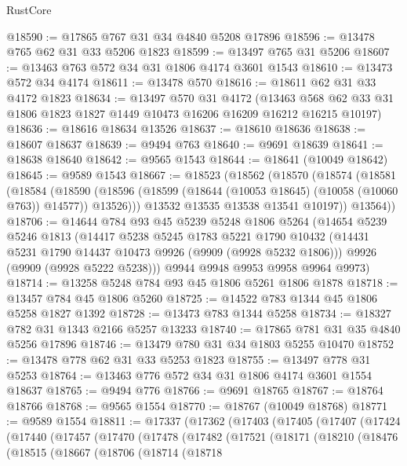 \begin{lexlean}{RustCore}
\begin{coremodule}
@18590 := @17865 @767 @31 @34 @4840 @5208 @17896
@18596 := @13478 @765 @62 @31 @33 @5206 @1823
@18599 := @13497 @765 @31 @5206
@18607 := @13463 @763 @572 @34 @31 @1806 @4174 @3601 @1543
@18610 := @13473 @572 @34 @4174
@18611 := @13478 @570
@18616 := @18611 @62 @31 @33 @4172 @1823
@18634 := @13497
    @570
    @31
    @4172
    (@13463 @568 @62 @33 @31 @1806 @1823 @1827 @1449 @10473 @16206 @16209 @16212 @16215 @10197)
@18636 := @18616 @18634 @13526
@18637 := @18610 @18636
@18638 := @18607 @18637
@18639 := @9494 @763
@18640 := @9691 @18639
@18641 := @18638 @18640
@18642 := @9565 @1543
@18644 := @18641 (@10049 @18642)
@18645 := @9589 @1543
@18667 := @18523
    (@18562
      (@18570
        (@18574
          (@18581
            (@18584
              (@18590
                (@18596 (@18599 (@18644 (@10053 @18645) (@10058 (@10060 @763)) @14577)) @13526)))
            @13532
            @13535
            @13538
            @13541
            @10197))
        @13564))
@18706 := @14644
    @784
    @93
    @45
    @5239
    @5248
    @1806
    @5264
    (@14654
      @5239
      @5246
      @1813
      (@14417
        @5238
        @5245
        @1783
        @5221
        @1790
        @10432
        (@14431 @5231 @1790 @14437 @10473 @9926 (@9909 (@9928 @5232 @1806)))
        @9926
        (@9909 (@9928 @5222 @5238)))
      @9944
      @9948
      @9953
      @9958
      @9964
      @9973)
@18714 := @13258 @5248 @784 @93 @45 @1806 @5261 @1806 @1878
@18718 := @13457 @784 @45 @1806 @5260
@18725 := @14522 @783 @1344 @45 @1806 @5258 @1827 @1392
@18728 := @13473 @783 @1344 @5258
@18734 := @18327 @782 @31 @1343 @2166 @5257 @13233
@18740 := @17865 @781 @31 @35 @4840 @5256 @17896
@18746 := @13479 @780 @31 @34 @1803 @5255 @10470
@18752 := @13478 @778 @62 @31 @33 @5253 @1823
@18755 := @13497 @778 @31 @5253
@18764 := @13463 @776 @572 @34 @31 @1806 @4174 @3601 @1554 @18637
@18765 := @9494 @776
@18766 := @9691 @18765
@18767 := @18764 @18766
@18768 := @9565 @1554
@18770 := @18767 (@10049 @18768)
@18771 := @9589 @1554
@18811 := @17337
    (@17362
      (@17403
        (@17405
          (@17407
            (@17424
              (@17440
                (@17457
                  (@17470
                    (@17478
                      (@17482
                        (@17521
                          (@18171
                            (@18210
                              (@18476
                                (@18515
                                  (@18667
                                    (@18706
                                      (@18714
                                        (@18718

\end{coremodule}
\end{lexlean}
